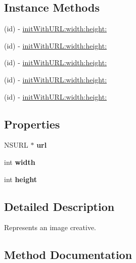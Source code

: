 \subsection*{Instance Methods}
\begin{DoxyCompactItemize}
\item 
(id) -\/ \hyperlink{interfaceFBAdImage_a1577c8437636079d3b9ca1a9bd9d39ac}{init\+With\+U\+R\+L\+:width\+:height\+:}
\item 
(id) -\/ \hyperlink{interfaceFBAdImage_a1577c8437636079d3b9ca1a9bd9d39ac}{init\+With\+U\+R\+L\+:width\+:height\+:}
\item 
(id) -\/ \hyperlink{interfaceFBAdImage_a1577c8437636079d3b9ca1a9bd9d39ac}{init\+With\+U\+R\+L\+:width\+:height\+:}
\item 
(id) -\/ \hyperlink{interfaceFBAdImage_a1577c8437636079d3b9ca1a9bd9d39ac}{init\+With\+U\+R\+L\+:width\+:height\+:}
\item 
(id) -\/ \hyperlink{interfaceFBAdImage_a1577c8437636079d3b9ca1a9bd9d39ac}{init\+With\+U\+R\+L\+:width\+:height\+:}
\end{DoxyCompactItemize}
\subsection*{Properties}
\begin{DoxyCompactItemize}
\item 
\mbox{\label{interfaceFBAdImage_aeef917f965465aaead57511ac28f90b3}} 
N\+S\+U\+RL $\ast$ {\bfseries url}
\item 
\mbox{\label{interfaceFBAdImage_a24e4b82c9caf2fdb451d2927fcdc056a}} 
int {\bfseries width}
\item 
\mbox{\label{interfaceFBAdImage_ae4ac6b59d11029c06b5a36ddc1c177e3}} 
int {\bfseries height}
\end{DoxyCompactItemize}


\subsection{Detailed Description}
Represents an image creative. 

\subsection{Method Documentation}
\mbox{\label{interfaceFBAdImage_a1577c8437636079d3b9ca1a9bd9d39ac}} 
